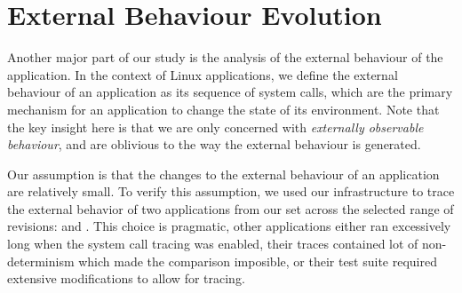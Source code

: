 \section{External Behaviour Evolution}
\label{sec:behavior-evolution}


Another major part of our study is the analysis of the external behaviour of
the application. In the context of Linux applications, we define the external
behaviour of an application as its sequence of system calls, which are the
primary mechanism for an application to change the state of its environment.
Note that the key insight here is that we are only concerned with
\emph{externally observable behaviour}, and are oblivious to the way the
external behaviour is generated.

Our assumption is that the changes to the external behaviour of an application
are relatively small. To verify this assumption, we used our infrastructure to
trace the external behavior of two applications from our set across the
selected range of revisions: \lighttpd and \lighttpdtwo. This choice is
pragmatic, other applications either ran excessively long when the system call
tracing was enabled, their traces contained lot of non-determinism which made
the comparison imposible, or their test suite required extensive modifications
to allow for tracing.


